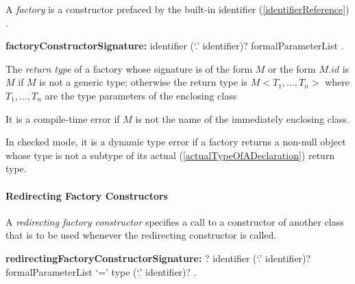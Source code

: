 \documentclass{article}
\begin{document}
\LMHash{}
A {\em factory} is a constructor prefaced by the built-in identifier  (\ref{identifierReference})   \FACTORY{}.

\begin{grammar}
{\bf factoryConstructorSignature:}
      \FACTORY{} identifier  (`{\escapegrammar .}' identifier)?  formalParameterList
    .
\end{grammar}



\LMHash{}
The {\em return type} of a factory whose signature is of the form \FACTORY{} $M$ or the form \FACTORY{} $M.id$ is $M$ if $M$ is not a generic type; otherwise the return type is  $M <T_1, \ldots, T_n>$ where $T_1, \ldots, T_n$ are the type parameters of the enclosing class

\LMHash{}
It is a compile-time error if $M$ is not the name of the immediately enclosing class.

\LMHash{}
In checked mode, it is a dynamic type error if a factory returns a non-null object whose type is not a subtype of its actual (\ref{actualTypeOfADeclaration}) return type.



\paragraph{Redirecting Factory Constructors}

\LMHash{}
A {\em redirecting factory constructor} specifies a call to a constructor of another class that is to be used whenever the redirecting constructor is called.

\begin{grammar}
{\bf redirectingFactoryConstructorSignature:}
      \CONST{}? \FACTORY{} identifier (`{\escapegrammar .}' identifier)? formalParameterList `=' type (`{\escapegrammar .}' identifier)?
    .
\end{grammar}
\end{document}
